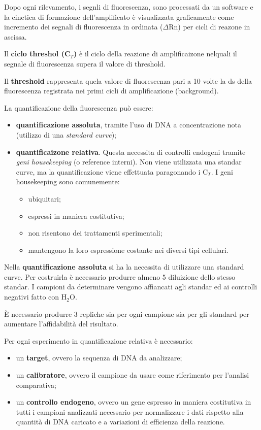 \documentclass[11pt]{book}
\begin{document}
Dopo ogni rilevamento, i segnli di fluorescenza, sono processati da un
software e la cinetica di formazione dell'amplificato è visualizzata
graficamente come incremento dei segnali di fluorescenza in ordinata
(\(\Delta\)Rn) per cicli di reazone in ascissa.

Il \textbf{ciclo threshol (C\(_T\))} è il ciclo della reazione di
amplificaizone nelquali il segnale di fluorescenza supera il valore di
threshold.

Il \textbf{threshold} rappresenta quela valore di fluorescenza pari a 10
volte la ds della fluorescenza registrata nei primi cicli di
amplificazione (background).

La quantificazione della fluorescenza può essere:

\begin{itemize}
\itemsep1pt\parskip0pt
\item
  \textbf{quantificazione assoluta}, tramite l'uso di DNA a
  concentrazione nota (utilizzo di una \emph{standard curve});
\item
  \textbf{quantificaizone relativa}. Questa necessita di controlli
  endogeni tramite \emph{geni housekeeping} (o reference interni). Non
  viene utilizzata una standar curve, ma la quantificazione viene
  effettuata paragonando i C\(_T\). I geni housekeeping sono
  comunemente:

  \begin{itemize}
  \itemsep1pt\parskip0pt
  \item
    ubiquitari;
  \item
    espressi in maniera costitutiva;
  \item
    non risentono dei trattamenti sperimentali;
  \item
    mantengono la loro espressione costante nei diversi tipi cellulari.
  \end{itemize}
\end{itemize}

Nella \textbf{quantificazione assoluta} si ha la necessita di utilizzare
una standard curve. Per costruirla è necessario produrre almeno 5
diluizione dello stesso standar. I campioni da determinare vengono
affiancati agli standar ed ai controlli negativi fatto con H\(_2\)O.

È necessario produrre 3 repliche sia per ogni campione sia per gli
standard per aumentare l'affidabilità del risultato.

Per ogni esperimento in quantificazione relativa è necessario:

\begin{itemize}
\itemsep1pt\parskip0pt
\item
  un \textbf{target}, ovvero la sequenza di DNA da analizzare;
\item
  un \textbf{calibratore}, ovvero il campione da usare come riferimento
  per l'analisi comparativa;
\item
  un \textbf{controllo endogeno}, ovvero un gene espresso in maniera
  costitutiva in tutti i campioni analizzati necessario per normalizzare
  i dati rispetto alla quantità di DNA caricato e a variazioni di
  efficienza della reazione.
\end{itemize}
\end{document}
